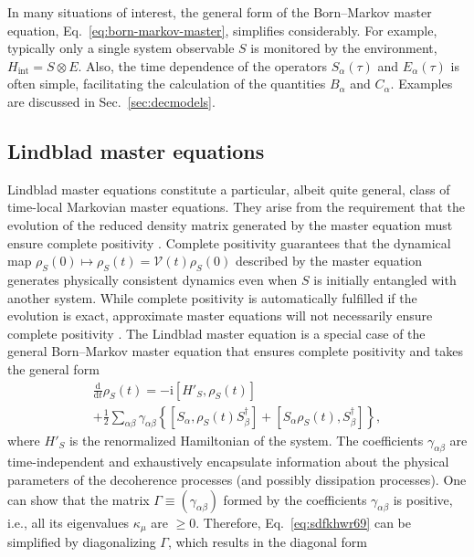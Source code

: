 \documentclass[aps,pra,reprint,amsmath,amssymb,showpacs,nofootinbib,floatfix,onecolumn,12pt]{revtex4-1}
\newcommand{\D}{\text{d}}
\newcommand{\I}{\text{i}}
\begin{document}
In many situations of interest, the general form of the Born--Markov master equation, Eq.~\eqref{eq:born-markov-master}, simplifies considerably. For example, typically only a single system observable $S$ is monitored by the environment, $H_\text{int} = S \otimes E$. Also, the time dependence of the operators $S_\alpha(\tau)$ and $E_\alpha(\tau)$ is often simple, facilitating the calculation of the quantities $B_\alpha$ and $C_\alpha$. Examples are discussed in Sec.~\ref{sec:decmodels}.


\subsection{Lindblad master equations}

Lindblad master equations constitute a particular, albeit quite general, class of time-local Markovian master equations. They arise from the requirement that the evolution of the reduced density matrix generated by the master equation must ensure  complete positivity \cite{Kraus:1971:ii,Gorini:1976:tt,Lindblad:1976:um,Breuer:2002:oq,Alicki:2001:aa,Alicki:2007:uu,Benatti:2005:ii}. Complete positivity guarantees that the dynamical map $\rho_{S}(0) \mapsto \rho_S(t) = \mathcal{V}(t) \rho_{S}(0)$ described by the master equation generates physically consistent dynamics even when $S$ is initially entangled with another system. While complete positivity is automatically fulfilled if the evolution is exact, approximate master equations will not necessarily ensure complete positivity \cite{Dumke:1979:ia,Breuer:2002:oq,Alicki:2001:aa,Alicki:2007:uu,Benatti:2005:ii}. The Lindblad master equation is a special case of the general Born--Markov master equation that ensures complete positivity and takes the general form \cite{Gorini:1976:tt,Lindblad:1976:um}
%
\begin{multline}
  \label{eq:sdfkhwr69}
\frac{\D}{\D t} \rho_S(t) = -\I \left[ H'_S, \rho_S(t) \right] \\+ \frac{1}{2} \sum_{\alpha\beta} \gamma_{\alpha\beta} \left\{ \left[ S_\alpha, \rho_S(t) S^\dagger_\beta
    \right] +  \left[ S_\alpha \rho_S(t), S^\dagger_\beta \right] \right\},
\end{multline}
%
where $H'_S$ is the renormalized Hamiltonian of the system. The coefficients $\gamma_{\alpha\beta}$ are time-independent and exhaustively encapsulate information about the physical parameters of the decoherence processes (and possibly dissipation processes). One can show that the matrix $\Gamma \equiv ( \gamma_{\alpha\beta} )$ formed by the coefficients $\gamma_{\alpha\beta}$ is positive, i.e., all its eigenvalues $\kappa_\mu$ are $\ge 0$. Therefore, Eq.~\eqref{eq:sdfkhwr69} can be simplified by diagonalizing $\Gamma$, which results in the diagonal form \cite{Lindblad:1976:um,Gorini:1978:uf}
\end{document}
